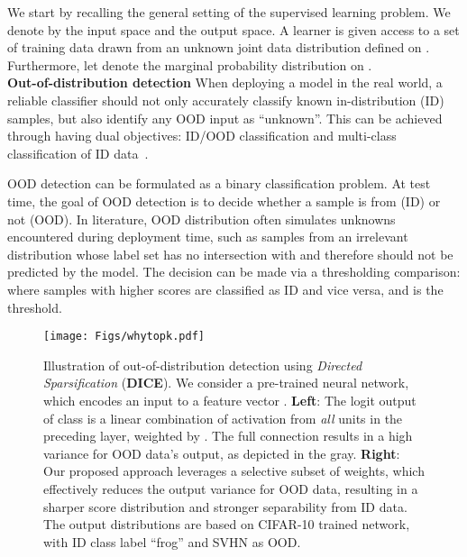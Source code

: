 \documentclass[runningheads]{llncs}
\begin{document}
We start by recalling the general setting of the supervised learning problem. We denote by   the input space and   the output space. A learner is given access to a set of training data  drawn from an unknown joint data distribution  defined on . Furthermore, let  denote the marginal probability distribution on . \\


\noindent \textbf{Out-of-distribution detection} When deploying a model in the real world, a reliable classifier should not only accurately classify known in-distribution (ID) samples, but also identify any OOD input as ``unknown''. This can be achieved through having dual objectives: ID/OOD classification and multi-class classification of ID data~\cite{bendale2016towards}. 

OOD detection can be formulated as a binary classification problem.  At test time, the goal of OOD detection is to decide whether a sample  is from  (ID) or not (OOD). In literature, OOD distribution  often simulates unknowns encountered during deployment time, such as samples from an irrelevant distribution {whose label set has no intersection with  and therefore should not be predicted by the model}. The decision can be made via a thresholding comparison: 
where samples with higher scores  are classified as ID and vice versa, and   is the threshold. 




\begin{figure*}[tb]
	\begin{center}
		\texttt{[image: Figs/whytopk.pdf]}
	\end{center}
	\caption{\small Illustration of out-of-distribution detection using \emph{Directed Sparsification} (\textbf{DICE}). We consider a pre-trained neural network, which encodes an input  to a feature vector . \textbf{Left}: The logit output  of class  is a linear combination of activation from \emph{all} units in the preceding layer, weighted by . The full connection results in a high variance for OOD data's output, as depicted in the gray. \textbf{Right}: Our proposed approach leverages a selective subset of weights, which effectively reduces the output variance for OOD data, resulting in a sharper score distribution and stronger separability from ID data. The output distributions are based on CIFAR-10 trained network, with ID class label ``frog'' and SVHN as OOD.}
	\label{fig:teaser}
\end{figure*}
\end{document}
